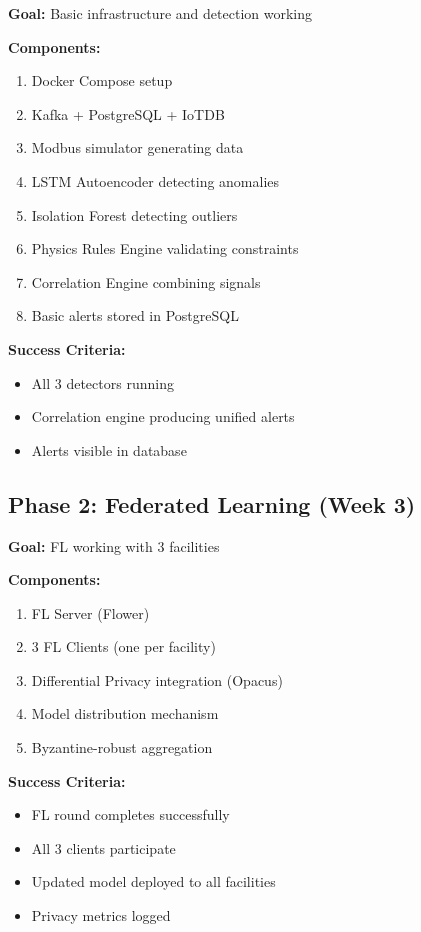 \documentclass[12pt,a4paper]{article}
\begin{document}
\textbf{Goal:} Basic infrastructure and detection working

\textbf{Components:}
\begin{enumerate}[leftmargin=1cm,itemsep=0pt]
    \item Docker Compose setup
    \item Kafka + PostgreSQL + IoTDB
    \item Modbus simulator generating data
    \item LSTM Autoencoder detecting anomalies
    \item Isolation Forest detecting outliers
    \item Physics Rules Engine validating constraints
    \item Correlation Engine combining signals
    \item Basic alerts stored in PostgreSQL
\end{enumerate}

\textbf{Success Criteria:}
\begin{itemize}[leftmargin=1cm,itemsep=0pt]
    \item All 3 detectors running
    \item Correlation engine producing unified alerts
    \item Alerts visible in database
\end{itemize}


\subsection{Phase 2: Federated Learning (Week 3)}

\textbf{Goal:} FL working with 3 facilities

\textbf{Components:}
\begin{enumerate}[leftmargin=1cm,itemsep=0pt]
    \item FL Server (Flower)
    \item 3 FL Clients (one per facility)
    \item Differential Privacy integration (Opacus)
    \item Model distribution mechanism
    \item Byzantine-robust aggregation
\end{enumerate}

\textbf{Success Criteria:}
\begin{itemize}[leftmargin=1cm,itemsep=0pt]
    \item FL round completes successfully
    \item All 3 clients participate
    \item Updated model deployed to all facilities
    \item Privacy metrics logged
\end{itemize}
\end{document}
